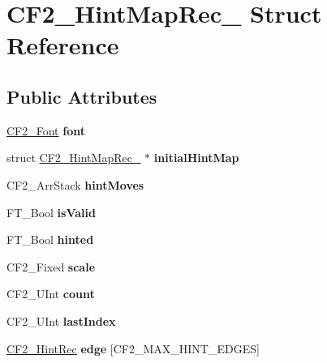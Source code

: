 \hypertarget{struct_c_f2___hint_map_rec__}{}\section{C\+F2\+\_\+\+Hint\+Map\+Rec\+\_\+ Struct Reference}
\label{struct_c_f2___hint_map_rec__}
\subsection*{Public Attributes}
\begin{DoxyCompactItemize}
\item 
\mbox{\label{struct_c_f2___hint_map_rec___ad932da0e7dca5711d66c0096e8c6c8a6}} 
\hyperlink{struct_c_f2___font_rec__}{C\+F2\+\_\+\+Font} {\bfseries font}
\item 
\mbox{\label{struct_c_f2___hint_map_rec___a49301ddb08ea5ee9fc5b5baa54057332}} 
struct \hyperlink{struct_c_f2___hint_map_rec__}{C\+F2\+\_\+\+Hint\+Map\+Rec\+\_\+} $\ast$ {\bfseries initial\+Hint\+Map}
\item 
\mbox{\label{struct_c_f2___hint_map_rec___a3dd4b4268fde7eb09ea90ca6fa72cfe3}} 
C\+F2\+\_\+\+Arr\+Stack {\bfseries hint\+Moves}
\item 
\mbox{\label{struct_c_f2___hint_map_rec___a1f6c111123b6b1dda7455b662629b70f}} 
F\+T\+\_\+\+Bool {\bfseries is\+Valid}
\item 
\mbox{\label{struct_c_f2___hint_map_rec___a57967bbe892291cb4944eb4a36e6ed70}} 
F\+T\+\_\+\+Bool {\bfseries hinted}
\item 
\mbox{\label{struct_c_f2___hint_map_rec___a6aa2a0b5b89138ff77232957d3abd2c6}} 
C\+F2\+\_\+\+Fixed {\bfseries scale}
\item 
\mbox{\label{struct_c_f2___hint_map_rec___a15e66b6340fe6ce8ed9ffd7344b334cd}} 
C\+F2\+\_\+\+U\+Int {\bfseries count}
\item 
\mbox{\label{struct_c_f2___hint_map_rec___a47a0509e845b63c34e9a41a72eb73b9a}} 
C\+F2\+\_\+\+U\+Int {\bfseries last\+Index}
\item 
\mbox{\label{struct_c_f2___hint_map_rec___afc5cc774d56a9685cab55e2528619693}} 
\hyperlink{struct_c_f2___hint_rec__}{C\+F2\+\_\+\+Hint\+Rec} {\bfseries edge} \mbox{[}C\+F2\+\_\+\+M\+A\+X\+\_\+\+H\+I\+N\+T\+\_\+\+E\+D\+G\+ES\mbox{]}
\end{DoxyCompactItemize}


